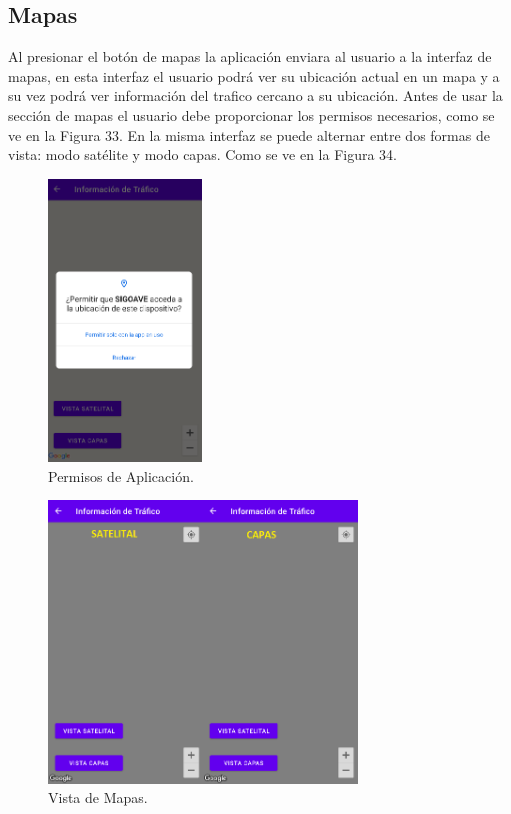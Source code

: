 \documentclass[a4paper,10pt, oneside, titlepage]{article}
\begin{document}
	\subsection{Mapas}
	Al presionar el botón de mapas la aplicación enviara al usuario a la interfaz de mapas, en esta interfaz el usuario podrá ver su ubicación actual en un mapa y a su vez podrá ver información del trafico cercano a su ubicación. Antes de usar la sección de mapas el usuario debe proporcionar los permisos necesarios, como se ve en la Figura 33. En la misma interfaz se puede alternar entre dos formas de vista: modo satélite y modo capas. Como se ve en la Figura 34.
	\begin{figure}[!ht]
		\centering
		\includegraphics[width = 0.4\linewidth, height = 7.5cm]{33.png}
		\caption{Permisos de Aplicación.}
	\end{figure}
	\begin{figure}[!ht]
		\centering
		\includegraphics[width = 0.6\linewidth, height = 7.5cm]{34.png}
		\caption{Vista de Mapas.}
	\end{figure}
	
\end{document}
